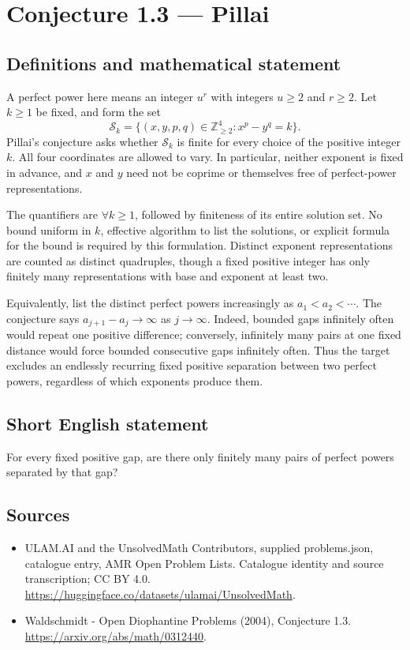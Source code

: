 \documentclass[11pt,a4paper]{article}
\begin{document}
\section*{Conjecture 1.3 — Pillai}\label{statement}

\subsection{Definitions and mathematical statement}
A perfect power here means an integer $u^r$ with integers $u\ge2$ and $r\ge2$. Let $k\ge1$ be fixed, and form the set
\[
\mathcal S_k=\{(x,y,p,q)\in\mathbb Z_{\ge2}^4:x^p-y^q=k\}.
\]
Pillai's conjecture asks whether $\mathcal S_k$ is finite for every choice of the positive integer $k$. All four coordinates are allowed to vary. In particular, neither exponent is fixed in advance, and $x$ and $y$ need not be coprime or themselves free of perfect-power representations.

The quantifiers are $\forall k\ge1$, followed by finiteness of its entire solution set. No bound uniform in $k$, effective algorithm to list the solutions, or explicit formula for the bound is required by this formulation. Distinct exponent representations are counted as distinct quadruples, though a fixed positive integer has only finitely many representations with base and exponent at least two.

Equivalently, list the distinct perfect powers increasingly as $a_1<a_2<\cdots$. The conjecture says $a_{j+1}-a_j\to\infty$ as $j\to\infty$. Indeed, bounded gaps infinitely often would repeat one positive difference; conversely, infinitely many pairs at one fixed distance would force bounded consecutive gaps infinitely often. Thus the target excludes an endlessly recurring fixed positive separation between two perfect powers, regardless of which exponents produce them.
\subsection{Short English statement}
For every fixed positive gap, are there only finitely many pairs of perfect powers separated by that gap?
\subsection{Sources}
\begin{itemize}
\item[S1] ULAM.AI and the UnsolvedMath Contributors, supplied problems.json, catalogue entry, AMR Open Problem Lists. Catalogue identity and source transcription; CC BY 4.0.
\url{https://huggingface.co/datasets/ulamai/UnsolvedMath}.
\item[S2] Waldschmidt - Open Diophantine Problems (2004), Conjecture 1.3. 
\url{https://arxiv.org/abs/math/0312440}.
\end{itemize}
\end{document}
